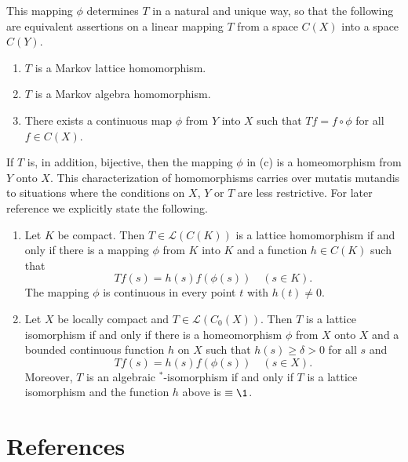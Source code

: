 This mapping $\phi$ determines $T$ in a natural and unique way, so that the following are equivalent assertions on a linear mapping $T$ from a space $C(X)$ into a space $C(Y)$.
\begin{enumerate}[\upshape (a)]
\item 
	$T$ is a Markov lattice homomorphism.
\item 
	$T$ is a Markov algebra homomorphism.
\item 
	There exists a continuous map $\phi$ from $Y$ into $X$ such that $Tf = f \circ \phi$ for all $f \in 	C(X)$.
\end{enumerate}
If\/ $T$ is, in addition, bijective, then the mapping $\phi$ in (c) is a homeomorphism from $Y$ onto $X$.
This characterization of homomorphisms carries over mutatis mutandis to situations where the conditions on $X$, $Y$ or $T$ are less restrictive.
For later reference we explicitly state the following.
\begin{enumerate}[\upshape (i), labelindent=.25em]
\item 
	Let $K$ be compact. Then $ T \in \mathcal{L}(C(K)) $ is a lattice homomorphism if and only if there is a mapping 
$\phi$ from $K$ into $K$ and a function $h \in C(K)$ such that 
%
\[
	Tf(s) = h(s)f(\phi(s)) \quad (s \in K) .
\]
%
The mapping $\phi$ is continuous in every point $t$ with $h(t) \neq 0$.

\item 
Let $X$ be locally compact and $T \in \mathcal{L}(C_{0}(X))$.
Then $T$ is a lattice isomorphism if and only if there is a homeomorphism $\phi$ from $X$ onto $X$ and a bounded continuous function $h$ on $X$ such that $h(s) \geq \delta > 0$ for all $s$ and 
%
\[
	Tf(s) = h(s)f(\phi(s)) \quad (s \in X) .
\]
%
Moreover, $T$ is an algebraic $^{*}$-isomorphism if and only if\/ $T$ is a lattice isomorphism and the function $h$ above is $\equiv \1$.
\end{enumerate}
\section*{References}
{\RaggedRight
\nocite{semadeni:1971}
  \printbibliography[heading=none]
 }
